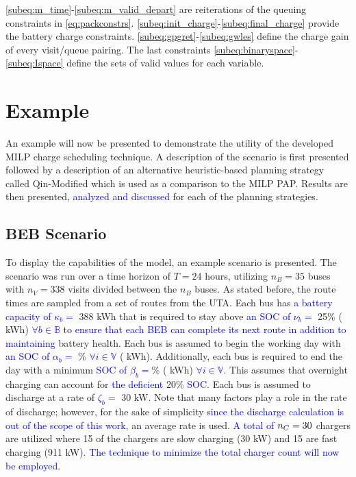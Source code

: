 \documentclass[utf8]{FrontiersinHarvard}
\newcommand{\A}{35 }                                                            %
\newcommand{\N}{338 }                                                           %
\newcommand{\acharge}{0.9}                                                      %
\newcommand{\bcharge}{0.7 }                                                     %
\newcommand{\mincharge}{25\% }                                                  %
\newcommand{\minchargeD}{0.25 }                                                 %
\newcommand{\batsize}{388 }                                                     %
\newcommand{\fast}{15 }                                                         %
\newcommand{\slow}{15 }                                                         %
\newcommand{\fasts}{911 }                                                       %
\newcommand{\slows}{30 }                                                        %
\begin{document}
\autoref{subeq:m_time}-\autoref{subeq:m_valid_depart} are reiterations of the queuing constraints in
\autoref{eq:packconstrs}. \autoref{subeq:init_charge}-\autoref{subeq:final_charge} provide the battery charge
constraints. \autoref{subeq:gpgret}-\autoref{subeq:gwles} define the charge gain of every visit/queue pairing. The last
constraints \autoref{subeq:binaryspace}-\autoref{subeq:Ispace} define the sets of valid values for each variable.
\section{Example}
\label{sec:example}
An example will now be presented to demonstrate the utility of the developed MILP charge scheduling technique. A
description of the scenario is first presented followed by a description of an alternative heuristic-based planning
strategy called Qin-Modified which is used as a comparison to the MILP PAP. Results are then presented,
\textcolor{blue}{analyzed and discussed} for each of the planning strategies.

\subsection{BEB Scenario}
\label{beb-scenario}
To display the capabilities of the model, an example scenario is presented. The scenario was run over a time horizon of
\(T=24\) hours, utilizing \(n_B = \A\) buses with \(n_V = \N\) visits divided between the \(n_B\) buses. As stated before, the
route times are sampled from a set of routes from the UTA. Each bus has \textcolor{blue}{a battery capacity of $\kappa_b =$} \batsize kWh that is required to stay above \textcolor{blue}{an SOC of $\nu_b =$}
\mincharge (\fpeval{\batsize * \minchargeD} kWh) \textcolor{blue}{$\forall b \in \mathbb{B}$} to
\textcolor{blue}{ensure that each BEB can complete its next route in addition to maintaining} battery health.
Each bus is assumed to begin the working day with \textcolor{blue}{an SOC of $\alpha_b = $}
\fpeval{\acharge*100}\% \textcolor{blue}{$\forall i \in \mathbb{V}$} (\fpeval{\acharge * \batsize} kWh).
Additionally, each bus is required to end the day with a minimum \textcolor{blue}{ SOC of $\beta_b = $}\fpeval{\bcharge * 100}\% (\fpeval{\bcharge * \batsize} kWh) \textcolor{blue}{$\forall i \in \mathbb{V}$}. This assumes that overnight charging can account for \textcolor{blue}{the deficient} 20\%
\textcolor{blue}{SOC}. Each bus is assumed to discharge at a rate of \textcolor{blue}{$\zeta_b = $} 30
kW. Note that many factors play a role in the rate of discharge; however, for the sake of simplicity
\textcolor{blue}{since the discharge calculation is out of the scope of this work}, an average rate is used.
\textcolor{blue}{A total of} \(n_C = \fpeval{\fast + \slow}\) chargers are utilized where \slow of the chargers
are slow charging (\slows kW) and \fast are fast charging (\fasts kW). \textcolor{blue}{The technique to minimize the total charger count will now be employed}.
\end{document}
